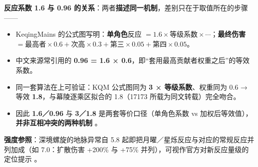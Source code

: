 \indent\textbf{反应系数 1.6 与 0.96 的关系}：两者\textbf{描述同一机制}，差别只在于取值所在的步骤——

\begin{itemize}
\item KeqingMains 的公式图写明：\textbf{单角色}反应 $= 1.6 \times \text{等级系数} \times \cdots$；\textbf{最终伤害} $= \text{最高者} \times 0.6 + \text{次高} \times 0.3 + \text{第三} \times 0.05 + \text{第四} \times 0.05$。
\item 中文来源常引用的 \textbf{0.96 = 1.6 × 0.6}，即“套用最高贡献者权重之后”的等效系数。
\item 同一套算法在上可验证：KQM 公式图同为 \textbf{3 × 等级系数}、权重同为 0.6 → 等效 \textbf{1.8}，与幕陵逐乘区拟合的 1.8（17173 所载为同文转载）完全吻合。
\item 因此 \textbf{1.6／0.96} 与 \textbf{3／1.8} 是两套等价口径（单角色系数 vs 加权后等效值），\textbf{并非互相冲突的两种机制} 。
\end{itemize}

\indent\textbf{强度参照}：深境螺旋的地脉异常自 5.8 起即把月曜／星烁反应与对应的常规反应并列加成（如 7.0：扩散伤害 +200\% 与 +75\% 并列），可视作官方对新反应量级的定位提示 。

\medskip
